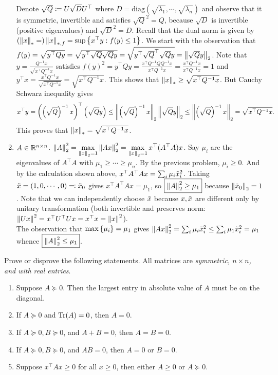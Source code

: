 \begin{enumerate}[leftmargin=*]
Denote $\sqrt{Q}\coloneqq U \sqrt D U^\top$ where $D=\text{diag}(\sqrt{\lambda_1},\cdots,\sqrt{\lambda_n})$ and observe that it is symmetric, invertible and satisfies $\sqrt Q^2 = Q$, because $\sqrt{D}$ is invertible (positive eigenvalues) and $\sqrt D^2=D$.
Recall that the dual norm is given by $\left(\left\lVert x \right\rVert_{*}=\right)\left\lVert x \right\rVert_{*,f} = \sup\left\{x^\top y : f(y)\leq 1\right\}$. We start with the observation that $f(y) = \sqrt{y^\top Q y} = \sqrt{y^\top \sqrt Q \sqrt Q y} = \sqrt{y^\top \sqrt Q^\top \sqrt Q y} = \left\lVert \sqrt Qy \right\rVert_{2}$. 
Note that $y=\frac{Q^{-1}x}{\sqrt{x^\top Q^{-1}x}}$ satisfies $f(y)^2 = y^\top Q y = \frac{x^\top Q^{-1} Q Q^{-1}x}{x^\top Q^{-1}x} = \frac{x^\top Q^{-1}x}{x^\top Q^{-1}x} = 1$ and $y^\top x= \frac{x^\top Q^{-1}x}{\sqrt{x^\top Q^{-1}x}} = \sqrt{x^\top Q^{-1}x}$. This shows that $\left\lVert x \right\rVert_{*} \geq \sqrt{x^\top Q^{-1}x}$. But Cauchy Schwarz inequality gives 
$$x^\top y = \left(\left(\sqrt Q\right)^{-1} x\right)^\top\left(\sqrt Qy\right)\leq \left\lVert \left(\sqrt Q\right)^{-1}x \right\rVert_{2}\left\lVert \sqrt Qy \right\rVert_{2} \leq \left\lVert \left(\sqrt Q\right)^{-1}x \right\rVert_{2}=\sqrt{x^\top Q^{-1}x}.$$ This proves that $\left\lVert x \right\rVert_{*} = \sqrt{x^\top Q^{-1}x}$.

\item $A\in\mathbb{R}^{n\times n}$. $\displaystyle\left\lVert A \right\rVert_{2} ^2 = \max_{\left\lVert x \right\rVert_{2} = 1}\left\lVert Ax \right\rVert_{2}^2 = \max_{\left\lVert x \right\rVert_{2} = 1} x^\top (A^\top A)x$. Say $\mu_i$ are the eigenvalues of $A^\top A$ with $\mu_1\geq\cdots\geq \mu_n$. By the previous problem, $\mu_i\geq 0$. And by the calculation shown above, $x^\top A^\top Ax = \sum_i\mu_i{\tilde{x}}_i^2$. Taking ${\tilde{x}} = (1,0,\cdots,0) \eqqcolon {\tilde{x}}_0$ gives $x^\top A^\top Ax = \mu_1$, so $\boxed{\left\lVert A \right\rVert_{2} ^2 \ge \mu_1}$ because $\left\lVert {\tilde{x}}_0 \right\rVert_{2}=1$. Note that we can independently choose ${\tilde{x}}$ because $x,{\tilde{x}}$ are different only by unitary transformation (both invertible and preserves norm: $\left\lVert Ux \right\rVert_{}^2 = x^\top U^\top U x = x^\top x = \left\lVert x \right\rVert_{}^2$).
\\
The observation that $\max\left\{\mu_i\right\}=\mu_1$ gives $\left\lVert Ax \right\rVert_{2}^2 = \sum_i\mu_i{\tilde{x}}_i^2 \leq \sum_i \mu_1 {\tilde{x}}_i^2 = \mu_1$ whence $\boxed{\left\lVert A \right\rVert_{2} ^2 \leq \mu_1}$.
\end{enumerate}













\newpage
\pb
Prove or disprove the following statements. All matrices are \textit{symmetric, $n \times n$, and with real entries}.
\begin{enumerate}[leftmargin=*, label=(\alph*)]
\item Suppose $A \succeq 0$. Then the largest entry in absolute value of $A$ must be on the diagonal.
\item If $A \succeq 0$ and $\operatorname{Tr}(A) = 0$, then $A = 0$.
\item If $A \succeq 0, B \succeq 0$, and $A + B = 0$, then $A = B = 0$.
\item If $A \succeq 0, B \succeq 0$, and $AB = 0$, then $A = 0$ or $B = 0$.
\item Suppose $x^\top Ax\ge0$ for all $x\ge0$, then either $A\ge0$ or $A\succeq0$. \end{enumerate}
\soln 

